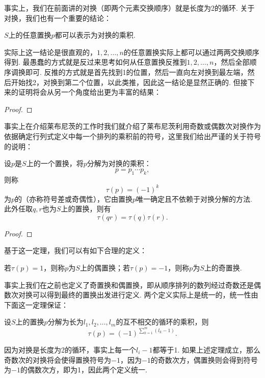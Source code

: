 事实上，我们在前面讲的对换（即两个元素交换顺序）就是长度为2的循环. 关于对换，我们也有一个重要的结论：
\begin{theorem}\label{thm:16:对换乘积}
    $S$上的任意置换$p$都可以表示为对换的乘积.
\end{theorem}

实际上这一结论是很直观的，$1,2,\ldots,n$的任意置换实际上都可以通过两两交换顺序得到. 最愚蠢的方式就是反过来思考如何从任意置换反推到$1,2,\ldots,n$，然后全部顺序调换即可. 反推的方式就是首先找到1的位置，然后一直向左对换到最左端，然后开始找2，对换到第二个位置，以此类推，因此这一结论是显然正确的. 但接下来的证明将会从另一个角度给出更为丰富的结果：

\begin{proof}

\end{proof}

事实上在介绍莱布尼茨的工作时我们就介绍了莱布尼茨利用奇数或偶数次对换作为依据确定行列式定义中每一个排列的乘积前的符号，这里我们给出严谨的关于符号的说明：
\begin{theorem}[置换的符号] \label{thm:16:置换的符号}
    设$p$是$S$上的一个置换，将$p$分解为对换的乘积：
    \[p=p_1\cdots p_k,\]
    则称
    \[\tau(p)=(-1)^k\]
    为$p$的（亦称符号差或奇偶性），它由置换$p$唯一确定且不依赖于对换分解的方法. 此外任取$q,r$也为$S$上的置换，则有
    \[\tau(qr)=\tau(q)\tau(r).\]
\end{theorem}

\begin{proof}

\end{proof}

基于这一定理，我们可以有如下合理的定义：
\begin{definition}
    若$\tau(p)=1$，则称$p$为$S$上的偶置换；若$\tau(p)=-1$，则称$p$为$S$上的奇置换.
\end{definition}

事实上我们在之前也定义了奇置换和偶置换，即从顺序排列的数列经过奇数还是偶数次对换可以得到最终的置换出发进行定义. 两个定义实际上是统一的，统一性由下面这一定理保证：
\begin{theorem}\label{thm:16:置换符号计算公式}
    设$S$上的置换$p$分解为长为$l_1,l_2,\ldots,l_m$的互不相交的循环的乘积，则
    \[\tau(p)=(-1)^{\sum\limits_{k=1}^m(l_k-1)}.\]
\end{theorem}

因为对换是长度为2的循环，事实上每一个$l_i-1$都等于1. 如果上述定理成立，那么奇数次的对换将会使得置换符号为$-1$，因为$-1$的奇数次方，偶置换则会得到符号为$-1$的偶数次方，即为1，因此两个定义统一.

